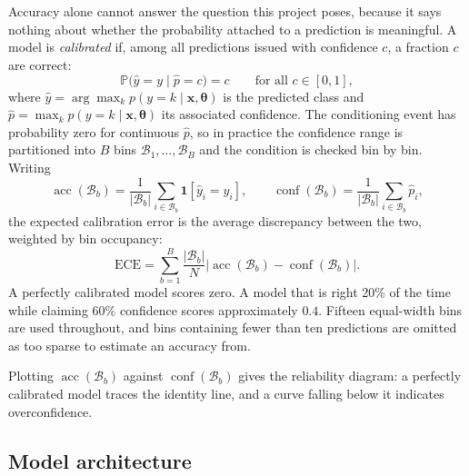 \documentclass{article}
\begin{document}
Accuracy alone cannot answer the question this project poses, because it says
nothing about whether the probability attached to a prediction is meaningful. A
model is \emph{calibrated} if, among all predictions issued with confidence $c$,
a fraction $c$ are correct:
\begin{equation}
\mathbb{P}\big(\hat{y} = y \;\big|\; \hat{p} = c\big) = c
\qquad \text{for all } c \in [0,1],
\label{eq:calibration}
\end{equation}
where $\hat{y} = \arg\max_k p(y=k \mid \mathbf{x}, \boldsymbol{\theta})$ is the
predicted class and $\hat{p} = \max_k p(y=k \mid \mathbf{x}, \boldsymbol{\theta})$
its associated confidence. The conditioning event has probability zero for
continuous $\hat{p}$, so in practice the confidence range is partitioned into $B$
bins $\mathcal{B}_1,\dots,\mathcal{B}_B$ and the condition is checked bin by bin.
Writing
\begin{equation}
\operatorname{acc}(\mathcal{B}_b) = \frac{1}{|\mathcal{B}_b|}\sum_{i \in \mathcal{B}_b} \mathbf{1}[\hat{y}_i = y_i],
\qquad
\operatorname{conf}(\mathcal{B}_b) = \frac{1}{|\mathcal{B}_b|}\sum_{i \in \mathcal{B}_b} \hat{p}_i,
\end{equation}
the expected calibration error \citep{guo2017} is the average discrepancy between the
two, weighted by bin occupancy:
\begin{equation}
\mathrm{ECE} = \sum_{b=1}^{B} \frac{|\mathcal{B}_b|}{N}
   \Big| \operatorname{acc}(\mathcal{B}_b) - \operatorname{conf}(\mathcal{B}_b) \Big|.
\label{eq:ece}
\end{equation}
A perfectly calibrated model scores zero. A model that is right 20\% of the time
while claiming 60\% confidence scores approximately $0.4$. Fifteen equal-width
bins are used throughout, and bins containing fewer than ten predictions are
omitted as too sparse to estimate an accuracy from.

Plotting $\operatorname{acc}(\mathcal{B}_b)$ against $\operatorname{conf}(\mathcal{B}_b)$
gives the reliability diagram: a perfectly calibrated model traces the identity
line, and a curve falling below it indicates overconfidence.

\subsection{Model architecture}

\begin{table}[!htbp]
\centering
\small

\caption{Classifier architecture. The same network is used for both objectives
and is held fixed for the approximate Bayesian methods that follow, so that any
difference in results is attributable to the inference procedure rather than to
model capacity. Dropout is included from the outset because it later serves as
the variational distribution for Monte Carlo dropout.}
\label{tab:architecture}
\end{table}
\end{document}
